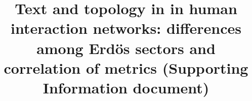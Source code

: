 \documentclass[%
 aip,
 jmp,%
 amsmath,amssymb,
 reprint,%
 floatfix,
]{revtex4-1}
\begin{document}


\title[Text and topology in interaction networks (Supporting Information)]{Text and topology in in human interaction networks: differences among Erd\"os sectors and correlation of metrics (Supporting Information document)}%
\end{document}
